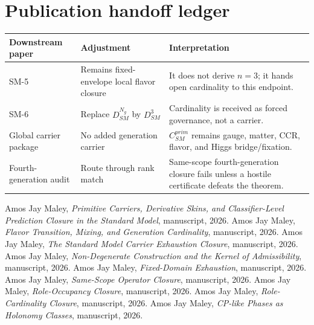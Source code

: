 \documentclass[11pt]{article}
\theoremstyle{definition}
\theoremstyle{plain}
\theoremstyle{remark}
\begin{document}
\section{Publication handoff ledger}
\begin{longtable}{L{0.24\textwidth}L{0.30\textwidth}L{0.36\textwidth}}
\toprule
Downstream paper & Adjustment & Interpretation\\
\midrule
SM-5 & Remains fixed-envelope local flavor closure & It does not derive \(n=3\); it hands open cardinality to this endpoint.\\
SM-6 & Replace \(D_{SM}^{N_g}\) by \(D_{SM}^{3}\) & Cardinality is received as forced governance, not a carrier.\\
Global carrier package & No added generation carrier & \(C_{SM}^{prim}\) remains gauge, matter, CCR, flavor, and Higgs bridge/fixation.\\
Fourth-generation audit & Route through rank match & Same-scope fourth-generation closure fails unless a hostile certificate defeats the theorem.\\
\bottomrule
\end{longtable}

\begin{thebibliography}{99}
 Amos Jay Maley, \emph{Primitive Carriers, Derivative Skins, and Classifier-Level Prediction Closure in the Standard Model}, manuscript, 2026.
 Amos Jay Maley, \emph{Flavor Transition, Mixing, and Generation Cardinality}, manuscript, 2026.
 Amos Jay Maley, \emph{The Standard Model Carrier Exhaustion Closure}, manuscript, 2026.
 Amos Jay Maley, \emph{Non-Degenerate Construction and the Kernel of Admissibility}, manuscript, 2026.
 Amos Jay Maley, \emph{Fixed-Domain Exhaustion}, manuscript, 2026.
 Amos Jay Maley, \emph{Same-Scope Operator Closure}, manuscript, 2026.
 Amos Jay Maley, \emph{Role-Occupancy Closure}, manuscript, 2026.
 Amos Jay Maley, \emph{Role-Cardinality Closure}, manuscript, 2026.
 Amos Jay Maley, \emph{CP-like Phases as Holonomy Classes}, manuscript, 2026.
\end{thebibliography}
\end{document}
